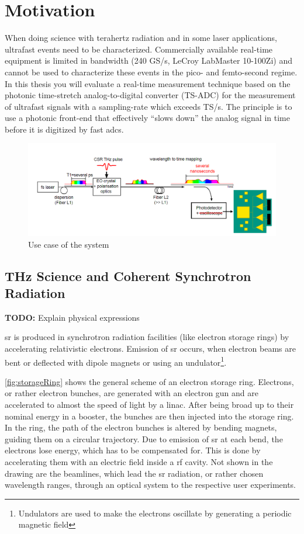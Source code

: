 \section{Motivation}
When doing science with terahertz radiation and in some laser applications, ultrafast events need to be characterized.
Commercially available real-time equipment is limited in bandwidth (240 GS/s, LeCroy LabMaster 10-100Zi) and cannot be used to characterize these events in the pico- and femto-second regime.
In this thesis you will evaluate a real-time measurement technique based on the photonic time-stretch analog-to-digital converter (TS-ADC) for the measurement of ultrafast signals with a sampling-rate which exceeds TS/s.
The principle is to use a photonic front-end that effectively ``slows down'' the analog signal in time before it is digitized by fast \glspl{adc}.

\begin{figure}[tbh]
	\centering
	\includegraphics[width=\textwidth]{chap/02-theory/img/motivation}
	\caption{Use case of the system}
	\label{fig:motivation}
\end{figure}

\subsection{THz Science and Coherent Synchrotron Radiation}
\textbf{TODO:} Explain physical expressions

\Gls{sr} is produced in synchrotron radiation facilities (like electron storage rings) by accelerating relativistic electrons.
Emission of \gls{sr} occurs, when electron beams are bent or deflected with dipole magnets or using an undulator\footnote{Undulators are used to make the electrons oscillate by generating a periodic magnetic field}. 

\autoref{fig:storageRing} shows the general scheme of an electron storage ring.
Electrons, or rather electron bunches, are generated with an electron gun and are accelerated to almost the speed of light by a \gls{linac}.
After being broad up to their nominal energy in a booster, the bunches are then injected into the storage ring.
In the ring, the path of the electron bunches is altered by bending magnets, guiding them on a circular trajectory.
Due to emission of \gls{sr} at each bend, the electrons lose energy, which has to be compensated for.
This is done by accelerating them with an electric field inside a \gls{rf} cavity.
Not shown in the drawing are the beamlines, which lead the \gls{sr} radiation, or rather chosen wavelength ranges, through an optical system to the respective user experiments. \cite{roussel2014} \cite{rota2018}


